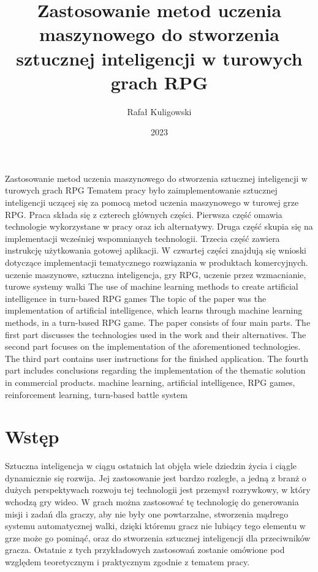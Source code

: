 \documentclass{SGGW-thesis}
\title{Zastosowanie metod uczenia maszynowego do stworzenia sztucznej inteligencji w turowych grach RPG}
\author{Rafał Kuligowski}
\date{2023}
\begin{document}
\maketitle
\statementpage
\abstractpage
{Zastosowanie metod uczenia maszynowego do stworzenia sztucznej inteligencji w turowych grach RPG}
{Tematem pracy było zaimplementowanie sztucznej inteligencji uczącej się za pomocą metod uczenia maszynowego w turowej grze RPG. Praca składa się z czterech głównych części.
Pierwsza część omawia technologie wykorzystane w pracy oraz ich alternatywy. Druga część skupia się na implementacji wcześniej wspomnianych technologii.
Trzecia część zawiera instrukcję użytkowania gotowej aplikacji. W czwartej części znajdują się wnioski dotyczące implementacji tematycznego rozwiązania w produktach komercyjnych.}
{uczenie maszynowe, sztuczna inteligencja, gry RPG, uczenie przez wzmacnianie, turowe systemy walki}
{The use of machine learning methods to create artificial intelligence in turn-based RPG games}
{The topic of the paper was the implementation of artificial intelligence, which learns through machine learning methods, in a turn-based RPG game. 
The paper consists of four main parts. The first part discusses the technologies used in the work and their alternatives. The second part focuses on 
the implementation of the aforementioned technologies. The third part contains user instructions for the finished application. The fourth part includes 
conclusions regarding the implementation of the thematic solution in commercial products.}
{machine learning, artificial intelligence, RPG games, reinforcement learning, turn-based battle system}


{
  \doublespacing
  \tableofcontents
}

\startchapterfromoddpage %

\chapter{Wstęp}
Sztuczna inteligencja w ciągu ostatnich lat objęła wiele dziedzin życia i ciągle dynamicznie się rozwija. 
Jej zastosowanie jest bardzo rozległe, a jedną z branż o dużych perspektywach rozwoju tej technologii jest przemysł rozrywkowy, 
w który wchodzą gry wideo. W grach można zastosować tę technologię do generowania misji i zadań dla graczy, aby nie były one powtarzalne, 
stworzenia mądrego systemu automatycznej walki, dzięki któremu gracz nie lubiący tego elementu w grze może go pominąć, oraz do stworzenia 
sztucznej inteligencji dla przeciwników gracza. Ostatnie z tych przykładowych zastosowań zostanie omówione pod względem teoretycznym i praktycznym 
zgodnie z tematem pracy.
\end{document}
